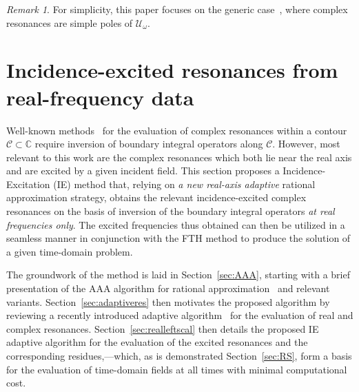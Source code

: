 \documentclass[11pt]{article}
\theoremstyle{plain}
\theoremstyle{remark}
\newtheorem{remark}{Remark}
\begin{document}
\begin{remark}\label{rmk:simple_reso}
  \label{simple} For simplicity, this paper focuses on the generic
  case~\cite{albert1975genericity, klopp1995generic}, where complex
  resonances are simple poles of $\mathcal{U}_\omega$.
\end{remark}


\section{Incidence-excited resonances from real-frequency data}\label{sec:AAA_and_res_alg}
Well-known
methods~\cite{Beyn2012eigen,asakura2009numerical,baum2005singularity}
for the evaluation of complex resonances within a contour
$\mathcal{C}\subset \mathbb{C}$ require inversion of boundary integral
operators along $\mathcal{C}$. However, most relevant to this work are
the complex resonances which both lie near the real axis and are
excited by a given incident field. This section proposes a
Incidence-Excitation (IE) method that, relying on {\em a new real-axis
  adaptive} rational approximation strategy, obtains the relevant
incidence-excited complex resonances on the basis of inversion of the
boundary integral operators {\em at real frequencies only}.  The
excited frequencies thus obtained can then be utilized in a seamless
manner in conjunction with the FTH method to produce the solution of a
given time-domain problem.

The groundwork of the method is laid in Section~\ref{sec:AAA},
starting with a brief presentation of the AAA algorithm for rational
approximation~\cite{AAA} and relevant
variants. Section~\ref{sec:adaptiveres} then motivates the proposed
algorithm by reviewing a recently introduced adaptive
algorithm~\cite{bst} for the evaluation of real and complex
resonances. Section~\ref{sec:realleftscal} then details the proposed
IE adaptive algorithm for the evaluation of the excited resonances and
the corresponding residues,---which, as is demonstrated
Section~\ref{sec:RS}, form a basis for the evaluation of time-domain
fields at all times with minimal computational cost.
\end{document}
